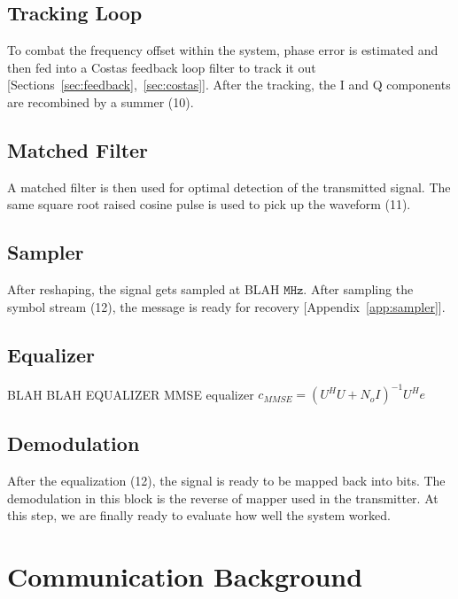 \documentclass[]{article}
\begin{document}
\subsection{Tracking Loop}
\label{sec:tracking}
To combat the frequency offset within the system, phase error is estimated and then fed into a Costas feedback loop filter to track it out [Sections~\ref{sec:feedback},~\ref{sec:costas}]. After the tracking, the I and Q components are recombined by a summer (10).

\subsection{Matched Filter}
\label{sec:matched}
A matched filter is then used for optimal detection of the transmitted signal.  The same square root raised cosine pulse is used to pick up the waveform (11).

\subsection{Sampler}
\label{sec:sample}
After reshaping, the signal gets sampled at BLAH $\mathtt{MHz}$.  After sampling the symbol stream (12), the message is ready for recovery [Appendix~\ref{app:sampler}].

\subsection{Equalizer}
\label{sec:equal}
BLAH BLAH EQUALIZER
MMSE equalizer 
$c_{MMSE} = (U^HU + N_oI)^{-1}U^He$ \\

\subsection{Demodulation}
\label{sec:demod}
After the equalization (12), the signal is ready to be mapped back into bits.  The demodulation in this block is the reverse of mapper used in the transmitter.  At this step, we are finally ready to evaluate how well the system worked.

\newpage
\section{Communication Background}
\end{document}

